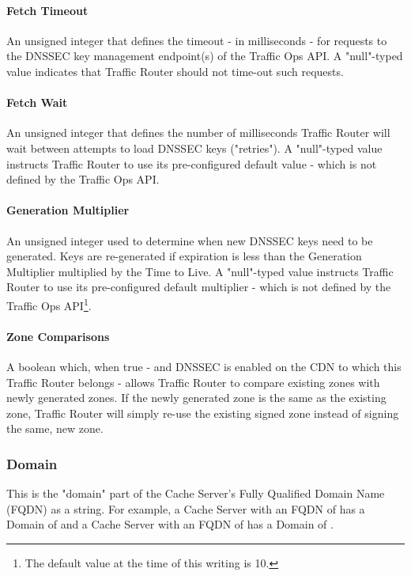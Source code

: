 \paragraph{Fetch Timeout}
An unsigned integer that defines the timeout - in milliseconds - for requests to
the DNSSEC key management endpoint(s) of the Traffic Ops API. A "null"-typed
value indicates that Traffic Router should not time-out such requests.

\paragraph{Fetch Wait}
An unsigned integer that defines the number of milliseconds Traffic Router will
wait between attempts to load DNSSEC keys ("retries"). A "null"-typed value
instructs Traffic Router to use its pre-configured default value - which is not
defined by the Traffic Ops API.

\paragraph{Generation Multiplier}
An unsigned integer used to determine when new DNSSEC keys need to be generated.
Keys are re-generated if expiration is less than the Generation Multiplier
multiplied by the Time to Live. A "null"-typed value instructs Traffic Router to
use its pre-configured default multiplier - which is not defined by the Traffic
Ops API\footnote{The default value at the time of this writing is 10.}.

\paragraph{Zone Comparisons}
A boolean which, when true - and DNSSEC is enabled on the CDN to which this
Traffic Router belongs - allows Traffic Router to compare existing zones with
newly generated zones. If the newly generated zone is the same as the existing
zone, Traffic Router will simply re-use the existing signed zone instead of
signing the same, new zone.

\subsubsection{Domain}
This is the "domain" part of the Cache Server's Fully Qualified Domain Name
(FQDN) as a string. For example, a Cache Server with an FQDN of
 has a Domain of  and a Cache Server with an FQDN of
 has a Domain of .

